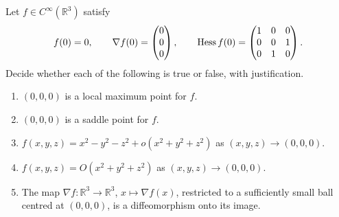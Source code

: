 \begin{exercise}
\label{ex:hessian_gradient_diffeomorphism}
Let $f \in C^\infty(\mathbb{R}^3)$ satisfy
\[f(0) = 0, \qquad \nabla f(0) = \begin{pmatrix} 0 \\ 0 \\ 0 \end{pmatrix}, \qquad
  \operatorname{Hess} f(0) = \begin{pmatrix} 1 & 0 & 0 \\ 0 & 0 & 1 \\ 0 & 1 & 0 \end{pmatrix}.\]
Decide whether each of the following is true or false, with justification.
\begin{enumerate}[label=\textbf{(\alph*)}]
  \item $(0,0,0)$ is a local maximum point for $f$.
  \item $(0,0,0)$ is a saddle point for $f$.
  \item $f(x,y,z) = x^2 - y^2 - z^2 + o(x^2+y^2+z^2)$ as $(x,y,z) \to (0,0,0)$.
  \item $f(x,y,z) = O(x^2+y^2+z^2)$ as $(x,y,z) \to (0,0,0)$.
  \item The map $\nabla f : \mathbb{R}^3 \to \mathbb{R}^3$, $x \mapsto \nabla f(x)$, restricted to a
    sufficiently small ball centred at $(0,0,0)$, is a diffeomorphism onto its image.
\end{enumerate}
\end{exercise}


